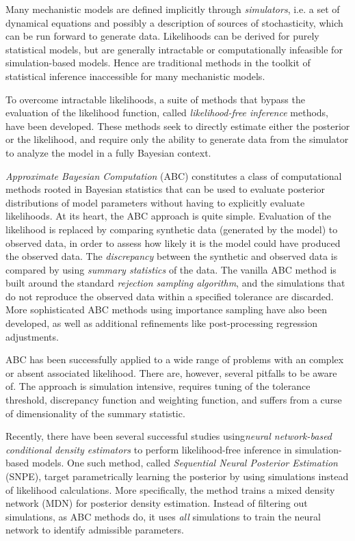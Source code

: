 Many mechanistic models are defined implicitly through \textit{simulators}, i.e. a set of dynamical equations and possibly a description of sources of stochasticity, which can be run forward to generate data. Likelihoods can be derived for purely statistical models, but are generally intractable or computationally infeasible for simulation-based models. Hence are traditional methods in the toolkit of statistical inference inaccessible for many mechanistic models.

To overcome intractable likelihoods, a suite of methods that bypass the evaluation of the likelihood function, called \textit{likelihood-free inference} methods, have been developed. These methods seek to directly estimate either the posterior or the likelihood, and require only the ability to generate data from the simulator to analyze the model in a fully Bayesian context. 

\textit{Approximate Bayesian Computation} (ABC) constitutes a class of computational methods rooted in Bayesian statistics that can be used to evaluate posterior distributions of model parameters without having to explicitly evaluate likelihoods. At its heart, the ABC approach is quite simple. Evaluation of the likelihood is replaced by comparing synthetic data (generated by the model) to observed data, in order to assess how likely it is the model could have produced the observed data. The \textit{discrepancy} between the synthetic and observed data is compared by using \textit{summary statistics} of the data. The vanilla ABC method is built around the standard \textit{rejection sampling algorithm}, and the simulations that do not reproduce the observed data within a specified tolerance are discarded. More sophisticated ABC methods using importance sampling have also been developed, as well as additional refinements like post-processing regression adjustments. 

ABC has been successfully applied to a wide range of problems with an complex or absent associated likelihood. There are, however, several pitfalls to be aware of. The approach is simulation intensive, requires tuning of the tolerance threshold, discrepancy function and weighting function, and suffers from a curse of dimensionality of the summary statistic.  

Recently, there have been several successful studies using\textit{neural network-based conditional density estimators} to perform likelihood-free inference in simulation-based models. One such method, called \textit{Sequential Neural Posterior Estimation} (SNPE), target parametrically learning the posterior by using simulations instead of likelihood calculations. More specifically, the method trains a mixed density network (MDN) for posterior density estimation. Instead of filtering out simulations, as ABC methods do, it uses \textit{all} simulations to train the neural network to identify admissible parameters. 

